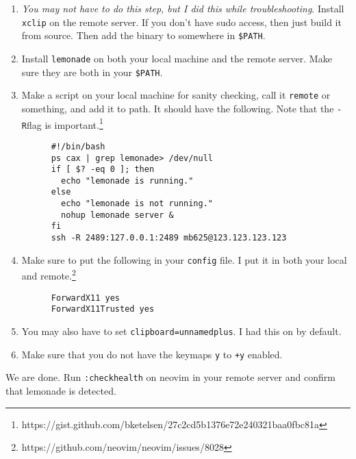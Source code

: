   \begin{enumerate}
    \item \textit{You may not have to do this step, but I did this while troubleshooting}. Install \texttt{xclip} on the remote server. If you don't have sudo access, then just build it from source. Then add the binary to somewhere in \texttt{\$PATH}. 

    \item Install \texttt{lemonade} on both your local machine and the remote server. Make sure they are both in your \texttt{\$PATH}. 

    \item Make a script on your local machine for sanity checking, call it \texttt{remote} or something, and add it to path. It should have the following. Note that the \texttt{-R}flag is important.\footnote{https://gist.github.com/bketelsen/27c2cd5b1376e72e240321baa0fbc81a} 

    \begin{lstlisting}
      #!/bin/bash
      ps cax | grep lemonade> /dev/null
      if [ $? -eq 0 ]; then
        echo "lemonade is running."
      else
        echo "lemonade is not running."
        nohup lemonade server &
      fi
      ssh -R 2489:127.0.0.1:2489 mb625@123.123.123.123
    \end{lstlisting}

    \item Make sure to put the following in your \texttt{config} file. I put it in both your local and remote.\footnote{https://github.com/neovim/neovim/issues/8028} 

    \begin{lstlisting}
      ForwardX11 yes
      ForwardX11Trusted yes
    \end{lstlisting}

    \item You may also have to set \texttt{clipboard=unnamedplus}. I had this on by default. 

    \item Make sure that you do not have the keymaps \texttt{y} to \texttt{+y} enabled. 
  \end{enumerate}

  We are done. Run \texttt{:checkhealth} on neovim in your remote server and confirm that lemonade is detected. 
